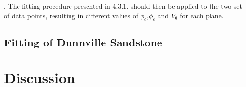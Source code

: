 . The fitting procedure presented in 4.3.1. should then be applied to the two set of data points, resulting in different values of $\phi_c$,$\phi_e$ and $V_0$ for each plane.

\subsection{Fitting of Dunnville Sandstone}


\section{Discussion}
